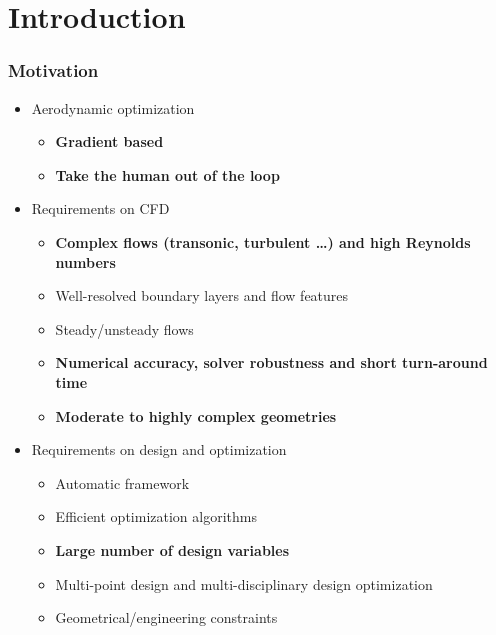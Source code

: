 \section{Introduction}



\begin{frame}
  \frametitle{Motivation}
  \begin{itemize}
    \item Aerodynamic optimization
     \begin{itemize}
       \item \textbf<2>{Gradient based}
       \item \textbf<2>{Take the human out of the loop}
     \end{itemize}
    \item Requirements on CFD
      \begin{itemize}
      \item \textbf<3>{Complex flows (transonic, turbulent \dots) and high Reynolds numbers}
      \item Well-resolved boundary layers and flow features
      \item Steady/unsteady flows
      \item \textbf<4>{Numerical accuracy, solver robustness and short turn-around time}
      \item \textbf<3>{Moderate to highly complex geometries}
      \end{itemize}
    \item Requirements on design and optimization 
      \begin{itemize}
      \item Automatic framework
      \item Efficient optimization algorithms
      \item \textbf<3>{Large number of design variables}
      \item Multi-point design and multi-disciplinary design optimization
      \item Geometrical/engineering constraints 
      \end{itemize}
   \end{itemize}
   \\
\end{frame}

